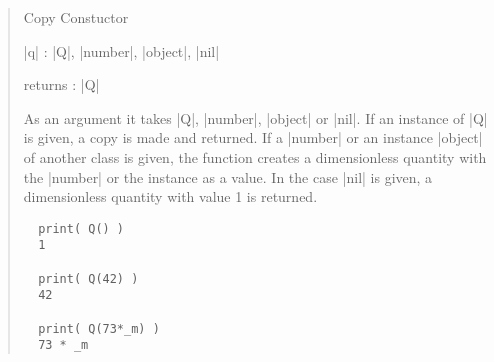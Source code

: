 \documentclass{ltxdoc}
\begin{document}
\begin{quote}
  Copy Constuctor

  \begin{description}
    \item |q| : |Q|, |number|, |object|, |nil|\\

    \item returns : |Q|\\
  \end{description}

  As an argument it takes |Q|, |number|, |object| or |nil|. If an instance of |Q| is given, a copy is made and returned. If a |number| or an instance |object| of another class is given, the function creates a dimensionless quantity with the |number| or the instance as a value. In the case |nil| is given, a dimensionless quantity with value 1 is returned.

  \begin{lstlisting}
  print( Q() )
  1

  print( Q(42) )
  42

  print( Q(73*_m) )
  73 * _m
  \end{lstlisting}
\end{quote}
\end{document}
